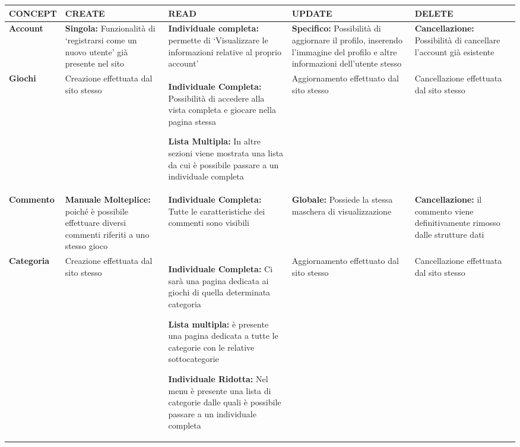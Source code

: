 \documentclass[../Report.tex]{subfiles}
\begin{document}
    \begin{table}[H]
        \hspace{-2.5cm}
        \begin{tabular}{|p{2.5cm}|p{3.5cm}|p{3.5cm}|p{3.5cm}|p{3.5cm}|}
            \hline
            \textbf{CONCEPT} & \textbf{CREATE} & \textbf{READ} & \textbf{UPDATE} & \textbf{DELETE} \\
            \hline
            \textbf{Account} & \cellcolor{gray} \textbf{Singola:} Funzionalità di ‘registrarsi come un nuovo utente’ già presente nel sito & \cellcolor{green} \textbf{Individuale completa:} permette di ‘Visualizzare le informazioni relative al proprio account’  & \cellcolor{green} \textbf{Specifico:} Possibilità di aggiornare il profilo, inserendo l’immagine del profilo e altre informazioni dell’utente stesso & \cellcolor{gray} \textbf{Cancellazione:} Possibilità di cancellare  l’account già esistente \\
            \hline
            \textbf{Giochi} & \cellcolor{red} Creazione effettuata dal sito stesso & \cellcolor{green} \textbf{Individuale Completa:} Possibilità di accedere alla vista completa e giocare nella pagina stessa

            \textbf{Lista Multipla:} In altre sezioni viene mostrata una lista da cui è possibile passare a un individuale completa
             & \cellcolor{red} Aggiornamento effettuato dal sito stesso & \cellcolor{red} Cancellazione effettuata dal sito stesso \\
            \hline
            \textbf{Commento} & \cellcolor{gray} \textbf{Manuale Molteplice:} poiché è possibile effettuare diversi commenti riferiti a uno stesso gioco & \cellcolor{gray} \textbf{Individuale Completa:} Tutte le caratteristiche dei commenti sono visibili & \cellcolor{gray} \textbf{Globale:} Possiede la stessa maschera di visualizzazione & \cellcolor{gray} \textbf{Cancellazione:} il commento viene definitivamente rimosso dalle strutture dati\\
            \hline
            \textbf{Categoria} & \cellcolor{red} Creazione effettuata dal sito stesso & \cellcolor{green} \textbf{Individuale Completa:} Ci sarà una pagina dedicata ai giochi di quella determinata categoria

            \textbf{Lista multipla:} è presente una pagina dedicata a tutte le categorie con le relative sottocategorie
            
            \textbf{Individuale Ridotta:} Nel menu è presente una lista di categorie dalle quali è possibile passare a un individuale completa
            
             & \cellcolor{red} Aggiornamento effettuato dal sito stesso & \cellcolor{red} Cancellazione effettuata dal sito stesso \\
            \hline
        \end{tabular}
    \end{table}
\end{document}
